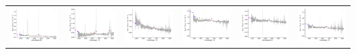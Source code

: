 \begin{center}
\begin{longtable}{l l l l l l }
    \includegraphics[width=0.3\linewidth, clip]{Figs/Figs-sdss/spec-0689-52262-0247-STRIPE82-0011-015494.pdf} & \includegraphics[width=0.3\linewidth, clip]{Figs/Figs-sdss/spec-0689-52262-0468-STRIPE82-0012-027933.pdf} & \includegraphics[width=0.3\linewidth, clip]{Figs/Figs-sdss/spec-0701-52179-0153-STRIPE82-0045-050333.pdf} & \includegraphics[width=0.3\linewidth, clip]{Figs/Figs-sdss/spec-0702-52178-0098-STRIPE82-0047-013896.pdf} & \includegraphics[width=0.3\linewidth, clip]{Figs/Figs-sdss/spec-0702-52178-0126-STRIPE82-0047-015137.pdf} & \includegraphics[width=0.3\linewidth, clip]{Figs/Figs-sdss/spec-0703-52209-0097-STRIPE82-0049-015869.pdf} \\

\end{longtable}
\end{center}
